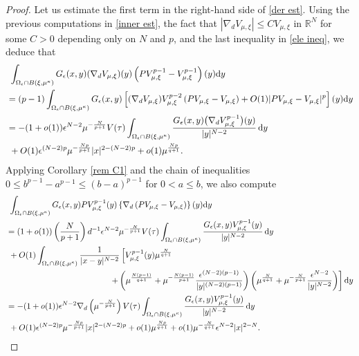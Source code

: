 \documentclass[reqno]{amsart}
\theoremstyle{remark}
\newcommand{\ep}{\epsilon}
\newcommand{\R}{\mathbb{R}}
\newcommand{\dy}{\textup{d}y}
\newcommand{\mx}{{\mu,\xi}}
\renewcommand{\(}{\left(}
\renewcommand{\)}{\right)}
\numberwithin{equation}{section}
\begin{document}
\begin{proof}
Let us estimate the first term in the right-hand side of \eqref{der est}. Using the previous computations in \eqref{inner est},
the fact that $|\nabla_d V_\mx| \le CV_\mx$ in $\R^N$ for some $C > 0$ depending only on $N$ and $p$, and the last inequality in \eqref{ele ineq}, we deduce that
\begin{equation}\label{der est1}
\begin{aligned}
&\ \int_{\Omega_\ep \cap B(\xi,\mu^\kappa)} G_\ep(x,y) (\nabla_d V_\mx)(y) \(PV_\mx^{p-1}-V_\mx^{p-1}\)(y)\dy \\
&= (p-1)\int_{\Omega_\ep \cap B(\xi,\mu^\kappa)} G_\ep(x,y) \left[(\nabla_d V_\mx) V_\mx^{p-2} \(PV_\mx-V_\mx\) +O(1)|PV_\mx-V_\mx|^p\right](y)\dy \\
&= -(1+o(1)) \ep^{N-2}\mu^{-\frac{N}{p+1}} V(\tau) \int_{\Omega_\ep \cap B(\xi,\mu^\kappa)} \frac{G_\ep(x,y) \big(\nabla_d V_\mx^{p-1}\big)(y)}{|y|^{N-2}}\, \dy \\
&\ + O(1)\ep^{(N-2)p}\mu^{-\frac{Np}{p+1}} |x|^{2-(N-2)p} + o(1)\mu^{\frac{Np}{q+1}}.
\end{aligned}
\end{equation}
Applying Corollary \ref{rem C1} and the chain of inequalities $0 \le b^{p-1}-a^{p-1} \le (b-a)^{p-1}$ for $0 < a \le b$, we also compute
\begin{equation}\label{der est2}
\begin{aligned}
&\ \int_{\Omega_\ep \cap B(\xi,\mu^\kappa)} G_\ep(x,y) PV_\mx^{p-1}(y) \left\{\nabla_d\(PV_\mx-V_\mx\)\right\}(y)\dy \\
&=(1+o(1)) \(\frac{N}{p+1}\) d^{-1}\ep^{N-2}\mu^{-\frac{N}{p+1}}V(\tau) \int_{\Omega_\ep \cap B(\xi,\mu^\kappa)} \frac{G_\ep(x,y) V_\mx^{p-1}(y)}{|y|^{N-2}}\, \dy \\
&\ + O(1)\int_{\Omega_\ep \cap B(\xi,\mu^\kappa)} \frac{1}{|x-y|^{N-2}} \left[V_\mx^{p-1}(y)\mu^{\frac{N}{q+1}} \right.\\
& \hspace{125pt} \left. + \(\mu^{\frac{N(p-1)}{q+1}} + \mu^{-\frac{N(p-1)}{p+1}}\frac{\ep^{(N-2)(p-1)}}{|y|^{(N-2)(p-1)}}\) \(\mu^{\frac{N}{q+1}}+\mu^{-\frac{N}{p+1}}\frac{\ep^{N-2}}{|y|^{N-2}} \)\right]\dy \\
&= -(1+o(1)) \ep^{N-2}\nabla_d\(\mu^{-\frac{N}{p+1}}\) V(\tau)\int_{\Omega_\ep \cap B(\xi,\mu^\kappa)} \frac{G_\ep(x,y) V_\mx^{p-1}(y)}{|y|^{N-2}}\, \dy \\
&\ + O(1) \ep^{(N-2)p}\mu^{-\frac{Np}{p+1}} |x|^{2-(N-2)p} + o(1)\mu^{\frac{Np}{q+1}} + o(1)\mu^{-\frac{N}{q+1}}\ep^{N-2}|x|^{2-N}.
\end{aligned}

\end{equation}
\end{proof}
\end{document}
